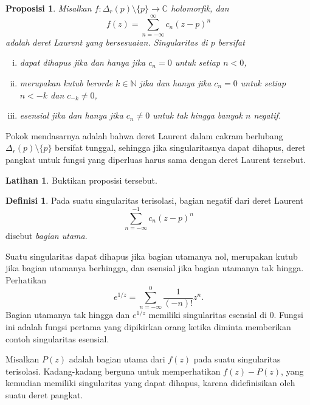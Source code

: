 \documentclass[12pt,openany]{book}
\newcommand{\C}{{\mathbb{C}}}
\newcommand{\N}{{\mathbb{N}}}
\newcommand{\myindex}[1]{#1\index{#1}}
\theoremstyle{plain}
\newtheorem{prop}[thm]{Proposisi}
\theoremstyle{remark}
\theoremstyle{definition}
\newtheorem{defn}[thm]{Definisi}
\newenvironment{exbox}{%
    \def\FrameCommand{\vrule width 1pt \relax\hspace{10pt}}%
    \MakeFramed{\advance\hsize-\width\FrameRestore}%
}{%
    \endMakeFramed
}
\theoremstyle{exercise}
\newtheorem{exercise}{Latihan}[section]
\theoremstyle{example}
\begin{document}
\begin{prop}
Misalkan $f \colon \Delta_r(p) \setminus \{p\} \to \C$ holomorfik,
dan
\begin{equation*}
f(z) = \sum_{n=-\infty}^\infty c_n {(z-p)}^n
\end{equation*}
adalah deret Laurent yang bersesuaian.
Singularitas di $p$ bersifat
\begin{enumerate}[(i)]
\item \emph{dapat dihapus} jika dan hanya jika $c_n = 0$ untuk setiap $n < 0$,
\item merupakan \emph{kutub} berorde $k \in \N$ jika dan hanya jika $c_n = 0$ untuk setiap $n < -k$ dan
$c_{-k} \neq 0$,
\item \emph{esensial} jika dan hanya jika $c_n \neq 0$ untuk tak hingga banyak $n$ negatif.
\end{enumerate}
\end{prop}

Pokok mendasarnya adalah bahwa deret Laurent dalam cakram berlubang
$\Delta_r(p) \setminus \{p\}$ bersifat tunggal,
sehingga jika singularitasnya dapat dihapus, deret pangkat
untuk fungsi yang diperluas harus sama dengan deret Laurent tersebut.

\begin{exbox}
\begin{exercise}
Buktikan proposisi tersebut.
\end{exercise}
\end{exbox}

\begin{defn} \label{defn:principalpart}
Pada suatu singularitas terisolasi, bagian negatif dari deret Laurent
\begin{equation*}
\sum_{n=-\infty}^{-1} c_n {(z-p)}^n
\end{equation*}
disebut \emph{\myindex{bagian utama}}.
\end{defn}

Suatu singularitas
dapat dihapus jika bagian utamanya nol, merupakan kutub jika bagian utamanya
berhingga, dan esensial jika bagian utamanya tak hingga.
Perhatikan
\begin{equation*}
e^{1/z}
=
\sum_{n=-\infty}^0 \frac{1}{(-n)!} z^n .
\end{equation*}
Bagian utamanya tak hingga dan $e^{1/z}$ memiliki singularitas
esensial di $0$. Fungsi ini adalah fungsi pertama yang dipikirkan orang
ketika diminta memberikan contoh singularitas esensial.

Misalkan $P(z)$ adalah bagian utama dari $f(z)$ pada suatu singularitas terisolasi.
Kadang-kadang berguna untuk memperhatikan $f(z)-P(z)$, yang kemudian memiliki singularitas
yang dapat dihapus, karena didefinisikan oleh suatu deret pangkat.
\end{document}
